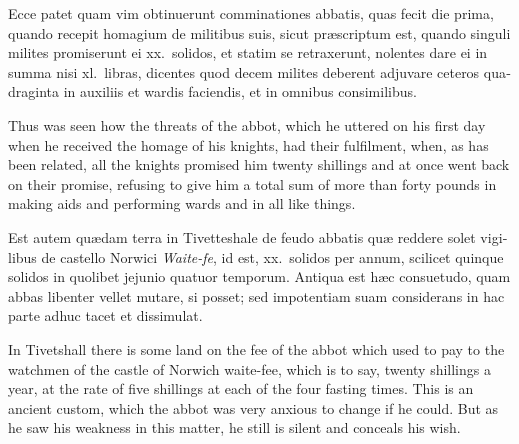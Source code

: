 \documentclass{book}
\begin{document}
\begin{paracol}{2}
\switchcolumn*

\begin{otherlanguage}{latin}
Ecce patet quam vim obtinuerunt comminationes abbatis, quas fecit die prima, quando recepit homagium de militibus suis, sicut pr\ae{}scriptum est, quando singuli milites promiserunt ei xx.\ solidos, et statim se retraxerunt, nolentes dare ei in summa nisi xl.\ libras, dicentes quod decem milites deberent adjuvare ceteros quadraginta in auxiliis et wardis faciendis, et in omnibus consimilibus.
\end{otherlanguage}

\switchcolumn

Thus was seen how the threats of the abbot, which he uttered on his first day when he received the homage of his knights, had their fulfilment, when, as has been related, all the knights promised him twenty shillings and at once went back on their promise, refusing to give him a total sum of more than forty pounds in making aids and performing wards and in all like things.

\switchcolumn*

\begin{otherlanguage}{latin}
Est autem qu\ae{}dam terra in Tivetteshale de feudo abbatis qu\ae{} reddere solet vigilibus de castello Norwici \emph{Waite-fe}, id est, xx.\ solidos per annum, scilicet quinque solidos in quolibet jejunio quatuor temporum. Antiqua est h\ae{}c consuetudo, quam abbas libenter vellet mutare, si posset; sed impotentiam suam considerans in hac parte adhuc tacet et dissimulat.
\end{otherlanguage}

\switchcolumn

In Tivetshall there is some land on the fee of the abbot which used to pay to the watchmen of the castle of Norwich waite-fee, which is to say, twenty shillings a year, at the rate of five shillings at each of the four fasting times. This is an ancient custom, which the abbot was very anxious to change if he could. But as he saw his weakness in this matter, he still is silent and conceals his wish.

\switchcolumn*


\end{paracol}
\end{document}
